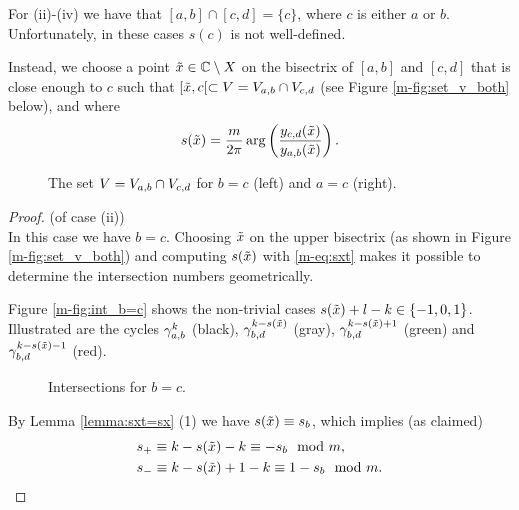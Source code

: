 \documentclass[main.tex]{subfiles}
\begin{document}
  For (ii)-(iv) we have that $[a,b] \cap [c,d] = \{c \}$, where $c$ is either $a$ or $b$. Unfortunately, in these cases $s(c)$ is not
  well-defined.

 Instead, we choose a point $\tilde{x} \in \mathbb{C} \setminus X$ on the bisectrix of
  $[a,b]$ and $[c,d]$ that is close enough to $c$ such that $[\tilde{x},c[ \subset V = V_{a,b} \cap V_{c,d}$
  (see Figure \ref{m-fig:set_v_both} below), and where
  \begin{equation}\label{eq:sxt}
   s(\tilde{x}) = \frac{m}{2\pi} \arg \left( \frac{y_{c,d}(\tilde{x})}{y_{a,b}(\tilde{x})} \right).
  \end{equation}
    \begin{figure}[H]
      \begin{center}
   \scalebox{.9}{}
      \end{center}
     \vspace{-1cm}
    \caption{The set $V = V_{a,b} \cap V_{c,d}$ for $b=c$ (left) and $a=c$ (right).}
    \label{fig:set_v_both}
   \end{figure}

   \begin{proof}\let\qed\relax (of case (ii)) \\
   In this case we have $b = c$. Choosing $\tilde{x}$ on the upper bisectrix (as shown in Figure \ref{m-fig:set_v_both})
   and computing $s(\tilde{x})$ with \eqref{m-eq:sxt} makes it possible to determine the intersection numbers geometrically.

   Figure \ref{m-fig:int_b=c} shows the non-trivial cases $s(\tilde{x}) + l - k \in \{-1,0,1\}$.
   Illustrated are the cycles $\gamma_{a,b}^k$ (black), $\gamma_{b,d}^{k-s(\tilde{x})}$ (gray), $\gamma_{b,d}^{k-s(\tilde{x}) + 1 }$ (green) and
    $\gamma_{b,d}^{k-s(\tilde{x})-1}$ (red).
    \begin{figure}[H]
      \begin{center}
   \scalebox{0.8}{}
      \end{center}
    \caption{Intersections for $b=c$.}
    \label{fig:int_b=c}
   \end{figure}
    By Lemma \ref{lemma:sxt=sx} (1) we have $s(\tilde{x}) \equiv s_b$, which implies (as claimed)
    \begin{align*}
    & s_+ \equiv k-s(\tilde{x})-k \equiv -s_b \mod m, \\
    & s_- \equiv k-s(\tilde{x})+1-k \equiv 1-s_b \mod m.
    \end{align*}
   \end{proof}
\end{document}
